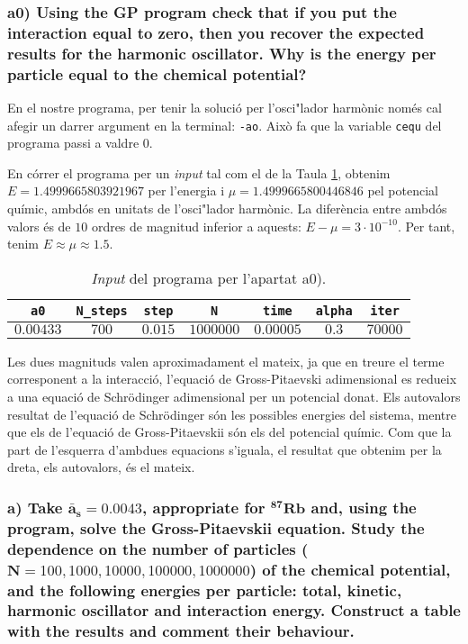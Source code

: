 \documentclass[a4paper]{article}
\begin{document}
\subsubsection*{a0) Using the GP program check that if you put the interaction equal to zero, then you recover the expected results
for the harmonic oscillator. Why is the energy per particle equal to the chemical potential?}

En el nostre programa, per tenir la solució per l'osci"lador harmònic només cal afegir un darrer argument en la terminal: \texttt{-ao}. Això fa que la variable \texttt{cequ} del programa passi a valdre $0$.

En córrer el programa per un \textit{input} tal com el de la Taula \ref{tab:input_a0}, obtenim $E=1.4999665803921967$ per l'energia i $\mu=1.4999665800446846$ pel potencial químic, ambdós en unitats de l'osci"lador harmònic. La diferència entre ambdós valors és de $10$ ordres de magnitud inferior a aquests: $E-\mu=3\cdot10^{-10}$. Per tant, tenim $E\approx \mu\approx 1.5$. 

\begin{table}[h!]
    \centering
    \begin{tabular}{|c|c|c|c|c|c|c|}
        \hline
        \rowcolor[HTML]{EFEFEF}
        \textbf{\texttt{a0}} & \textbf{\texttt{N\_steps}} & \textbf{\texttt{step}} &\textbf{\texttt{N}} & \textbf{\texttt{time}} & \textbf{\texttt{alpha}} & \textbf{\texttt{iter}} \\ \hline\hline
        $0.00433$ & $700$ & $0.015$ & $1000000$ & $0.00005$ & $0.3$ & $70000$ \\ \hline
    \end{tabular}
\caption{\textit{Input} del programa per l'apartat a0).}
\label{tab:input_a0}
\end{table}

Les dues magnituds valen aproximadament el mateix, ja que en treure el terme corresponent a la interacció, l'equació de Gross-Pitaevski adimensional es redueix a una equació de Schrödinger adimensional per un potencial donat. Els autovalors resultat de l'equació de Schrödinger són les possibles energies del sistema, mentre que els de l'equació de Gross-Pitaevskii són els del potencial químic. Com que la part de l'esquerra d'ambdues equacions s'iguala, el resultat que obtenim per la dreta, els autovalors, és el mateix.

\subsubsection*{a) Take $\mathbf{\bar a_s = 0.0043}$, appropriate for $\mathbf{^{87}Rb}$ and, using the program, solve the Gross-Pitaevskii equation. Study the dependence on the number of particles ($\mathbf{N}=100, 1000, 10000, 100000, 1000000$) of the chemical potential, and the following energies per particle: total, kinetic, harmonic oscillator and interaction energy. Construct a table with the results and comment their behaviour.}
\end{document}
